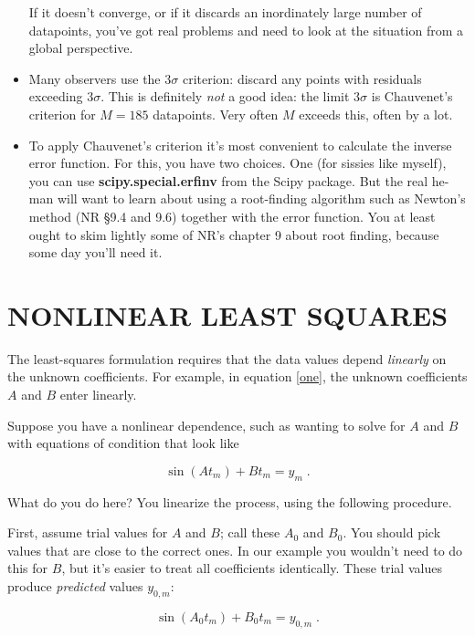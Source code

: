\documentclass[psfig,preprint]{aastex}
\begin{document}
\begin{itemize}
	If it doesn't converge, or if it discards an inordinately large
number of datapoints, you've got real problems and need to look at the
situation from a global perspective.

	\item Many observers use the $3\sigma$ criterion: discard any
points with residuals exceeding $3\sigma$. This is definitely {\it not}
a good idea: the limit $3\sigma$ is Chauvenet's criterion for $M=185$
datapoints. Very often $M$ exceeds this, often by a lot. 

	\item To apply Chauvenet's criterion it's most convenient to
calculate the inverse error function. For this, you have two choices.
One (for sissies like myself), you can use {\bf scipy.special.erfinv} 
from the Scipy package. But the real he-man will want to learn about
using a root-finding algorithm such as Newton's method (NR \S 9.4 and
9.6) together with the error function. You at least ought to skim lightly some
of NR's chapter 9 about root finding, because some day you'll need it.

\end{itemize}

\section{NONLINEAR LEAST SQUARES} \label{nonlinearls}

	The least-squares formulation requires that the data values
depend {\it linearly} on the unknown coefficients. For example, in
equation \ref{one}, the unknown coefficients $A$ and $B$ enter linearly.

	Suppose you have a nonlinear dependence, such as wanting to
solve for $A$ and $B$ with equations of condition that look like 

\begin{equation} \label{basicone}
\sin(A t_m) + B t_m = y_m \; .
\end{equation}

\noindent What do you do here? You linearize the process, using the
following procedure. 

	First, assume trial values for $A$ and $B$; call these $A_0$
and $B_0$. You should pick values that are close to the correct ones. In
our example you wouldn't need to do this for $B$, but it's easier to
treat all coefficients identically. These trial values produce {\it
predicted} values $y_{0,m}$:

\begin{equation} \label{trialone}
\sin(A_0 t_m) + B_0 t_m = y_{0,m} \; .
\end{equation}
\end{document}
